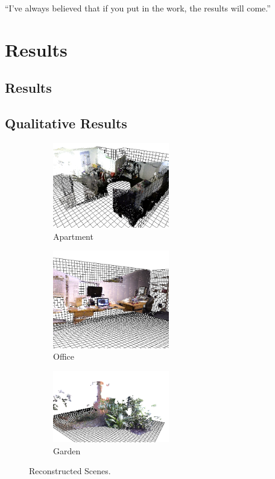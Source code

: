 \begin{savequote}[8cm]
  ``I've always believed that if you put in the work, the results will come.''
\end{savequote}
\makeatletter
\chapter{Results}

\section{Results}

\section{Qualitative Results}

\begin{figure}[t] 
        \centering
        \begin{subfigure}[b]{2.0in}
                \includegraphics[width=2.0in]{images/ch2/unit21}
                \caption{Apartment}
                \label{fig:RECON_UNIT}
        \end{subfigure}%
        \begin{subfigure}[b]{2.0in}
                \includegraphics[width=2.0in]{images/ch2/officeA}
                \caption{Office}
                \label{fig:RECON_OFFICE}
        \end{subfigure}%
        \begin{subfigure}[b]{2.0in}
                \includegraphics[width=2.0in]{images/ch2/outdoorA}
                \caption{Garden}
                \label{fig:RECON_GARDEN}
        \end{subfigure}
       \caption{Reconstructed Scenes.}
       \label{fig:RECONSTRUCTIONS}
\end{figure}

